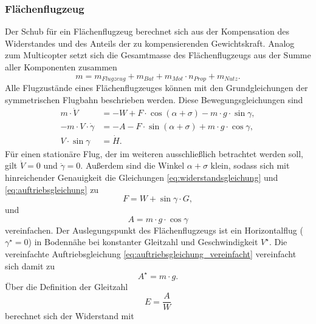 \subsubsection{Flächenflugzeug}
Der Schub für ein Flächenflugzeug berechnet sich aus der Kompensation des Widerstandes und des Anteils der zu kompensierenden Gewichtskraft. Analog zum Multicopter setzt sich die Gesamtmasse des Flächenflugzeugs aus der Summe aller Komponenten zusammen
\begin{equation}
	m = m_{Flugzeug}+m_{Bat}+m_{Mot}\cdot n_{Prop}+m_{Nutz}.
\end{equation}
Alle Flugzustände eines Flächenflugzeuges können mit den Grundgleichungen der symmetrischen Flugbahn beschrieben werden. Diese Bewegungsgleichungen \cite[S.77]{Bruning.1986} sind
\begin{align}
	m\cdot \dot{V} &= -W + F\cdot\cos(\alpha+\sigma)-m\cdot g\cdot\sin\gamma , \label{eq:widerstandsgleichung} \\ 
	-m\cdot V\cdot\dot{\gamma} &= -A - F\cdot\sin(\alpha+\sigma)+m\cdot g\cdot\cos\gamma , \label{eq:auftriebsgleichung} \\ 
	V\cdot\sin\gamma &= \dot{H}. \label{eq:steiggleichung}
\end{align}	
Für einen stationäre Flug, der im weiteren ausschließlich betrachtet werden soll, gilt \ensuremath{\dot{V} = 0} und \ensuremath{\dot{\gamma} = 0}. Außerdem sind die Winkel \ensuremath{\alpha + \sigma} klein, sodass sich mit hinreichender Genauigkeit die Gleichungen \ref{eq:widerstandsgleichung} und \ref{eq:auftriebsgleichung} zu
\begin{equation}
	F = W + \sin\gamma\cdot G, 
	\label{eq:widerstandsgleichung_vereinfacht}
\end{equation}
und
\begin{equation}
	A = m\cdot g\cdot\cos\gamma 
	\label{eq:auftriebsgleichung_vereinfacht}
\end{equation} 
vereinfachen. Der Auslegungspunkt des Flächenflugzeugs ist ein Horizontalflug (\ensuremath{\gamma^\star = 0}) in Bodennähe bei konstanter Gleitzahl und Geschwindigkeit \ensuremath{V^\star}. Die vereinfachte Auftriebsgleichung \ref{eq:auftriebsgleichung_vereinfacht} vereinfacht sich damit zu
\begin{equation}
	A^\star = m\cdot g .
\end{equation}
Über die Definition der Gleitzahl 
\begin{equation}
	E = \frac{A}{W}
\end{equation}
berechnet sich der Widerstand mit
